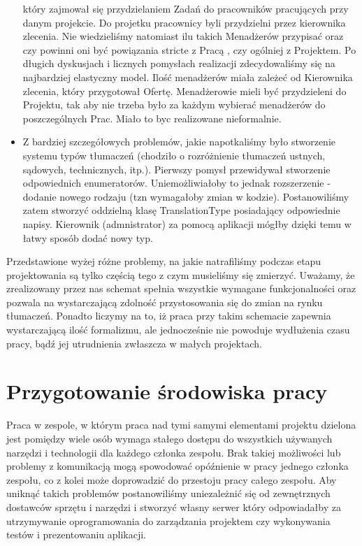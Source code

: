 \documentclass[licencjacka]{pracamgr}
\begin{document}
\begin{itemize}
który zajmował się przydzielaniem Zadań do pracowników pracujących przy danym projekcie. Do projetku pracownicy byli przydzielni przez kierownika zlecenia.
Nie wiedzieliśmy natomiast ilu takich Menadżerów przypisać oraz czy powinni oni być powiązania stricte z Pracą , czy ogólniej z Projektem. 
Po długich dyskusjach i licznych pomysłach realizacji zdecydowaliśmy się na najbardziej elastyczny model. Ilość menadżerów miała zależeć od Kierownika zlecenia, który przygotował Ofertę. 
Menadżerowie mieli być przydzieleni do Projektu, tak aby nie trzeba było za każdym wybierać menadżerów do poszczególnych Prac.
Miało to byc realizowane nieformalnie.
\item Z bardziej szczegółowych problemów, jakie napotkaliśmy było stworzenie systemu typów tłumaczeń (chodziło o rozróżnienie tłumaczeń ustnych, sądowych, technicznych, itp.).
Pierwszy pomysł przewidywał stworzenie odpowiednich enumeratorów. Uniemożliwiałoby to jednak rozszerzenie - dodanie nowego rodzaju (tzn wymagałoby zmian w kodzie). 
Postanowiliśmy zatem stworzyć oddzielną klasę TranslationType posiadający odpowiednie napisy. Kierownik (admnistrator) za pomocą aplikacji mógłby dzięki temu w łatwy sposób dodać nowy typ.
\end{itemize}
Przedstawione wyżej różne problemy, na jakie natrafiliśmy podczas etapu projektowania są tylko częścią tego z czym musieliśmy się zmierzyć. 
Uważamy, że zrealizowany przez nas schemat spełnia wszystkie wymagane funkcjonalności oraz pozwala na wystarczającą zdolność przystosowania się do zmian na rynku tłumaczeń.
Ponadto liczymy na to, iż praca przy takim schemacie zapewnia wystarczającą ilość formalizmu, ale jednocześnie nie powoduje wydłużenia czasu pracy, bądź jej utrudnienia zwłaszcza w małych projektach. 

\section{Przygotowanie środowiska pracy}
Praca w zespole, w którym praca nad tymi samymi elementami projektu dzielona jest pomiędzy wiele osób wymaga stałego dostępu do wszystkich używanych narzędzi i technologii dla każdego członka zespołu. Brak takiej możliwości lub problemy z komunikacją mogą spowodować opóźnienie w pracy jednego członka zespołu, co z kolei może doprowadzić do przestoju pracy całego zespołu. Aby uniknąć takich problemów postanowiliśmy uniezależnić się od zewnętrznych dostawców sprzętu i narzędzi i stworzyć własny serwer który odpowiadałby za utrzymywanie oprogramowania do zarządzania projektem czy wykonywania testów i prezentowaniu aplikacji. \\
\end{document}
